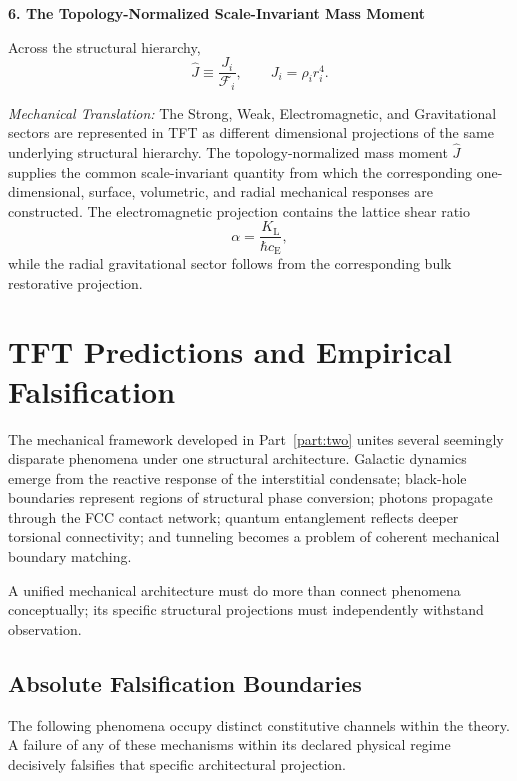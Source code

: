 \vspace{0.5em}
\noindent\textbf{6. The Topology-Normalized Scale-Invariant Mass Moment}

Across the structural hierarchy,
\begin{equation}
    \hat{J}
    \equiv
    \frac{J_i}{\mathcal{F}_i},
    \qquad
    J_i
    =
    \rho_i r_i^4.
\end{equation}

\textit{Mechanical Translation:}
The Strong, Weak, Electromagnetic, and Gravitational sectors are represented in TFT as different dimensional projections of the same underlying structural hierarchy. The topology-normalized mass moment $\hat J$ supplies the common scale-invariant quantity from which the corresponding one-dimensional, surface, volumetric, and radial mechanical responses are constructed. The electromagnetic projection contains the lattice shear ratio
\begin{equation}
    \alpha
    =
    \frac{K_{\mathrm L}}
    {\hbar c_{\mathrm E}},
\end{equation}
while the radial gravitational sector follows from the corresponding bulk restorative projection.


\section{TFT Predictions and Empirical Falsification}
\label{sec:empirical_falsification_partII}

The mechanical framework developed in Part~\ref{part:two} unites several seemingly disparate phenomena under one structural architecture. Galactic dynamics emerge from the reactive response of the interstitial condensate; black-hole boundaries represent regions of structural phase conversion; photons propagate through the FCC contact network; quantum entanglement reflects deeper torsional connectivity; and tunneling becomes a problem of coherent mechanical boundary matching. 

A unified mechanical architecture must do more than connect phenomena conceptually; its specific structural projections must independently withstand observation. 

\subsection*{Absolute Falsification Boundaries}

The following phenomena occupy distinct constitutive channels within the theory. A failure of any of these mechanisms within its declared physical regime decisively falsifies that specific architectural projection.

